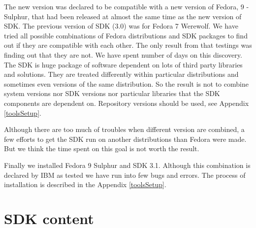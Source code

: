 \par
The new version was declared to be compatible with a new version of Fedora, 9 - Sulphur, that had been released at almost the same time as the new version of SDK.
The previous version of SDK (3.0) was for Fedora 7 Werewolf.
We have tried all possible combinations of Fedora distributions and SDK packages to find out if they are compatible with each other.
The only result from that testings was finding out that they are not.
We have spent number of days on this discovery.
The SDK is huge package of software dependent on lots of third party libraries and solutions.
They are treated differently within particular distributions and sometimes even versions of the same distribution.
So the result is not to combine system versions nor SDK versions nor particular libraries that the SDK components are dependent on.
Repository versions should be used, see Appendix \ref{toolsSetup}.

\par
Although there are too much of troubles when different version are combined, a few efforts to get the SDK run on another distributions than Fedora were made.
But we think the time spent on this goal is not worth the result.

\par
Finally we installed Fedora 9 Sulphur and SDK 3.1.
Although this combination is declared by IBM as tested we have run into few bugs and errors.
The process of installation is described in the Appendix \ref{toolsSetup}.

\section {SDK content}

